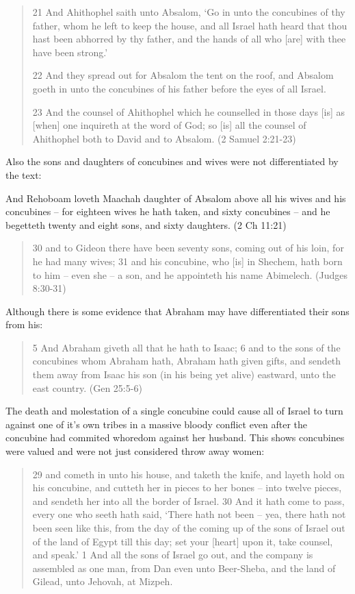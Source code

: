\documentclass[11pt]{article}
\begin{document}
{\begin{quote}
21 And Ahithophel saith unto Absalom, `Go in unto the concubines of thy father, whom he left to keep the house, and all Israel hath heard that thou hast been abhorred by thy father, and the hands of all who [are] with thee have been strong.'

22 And they spread out for Absalom the tent on the roof, and Absalom goeth in unto the concubines of his father before the eyes of all Israel.

23 And the counsel of Ahithophel which he counselled in those days [is] as [when] one inquireth at the word of God; so [is] all the counsel of Ahithophel both to David and to Absalom.
(2 Samuel 2:21-23)
\end{quote}

Also the sons and daughters of concubines and wives were not differentiated by the text:

And Rehoboam loveth Maachah daughter of Absalom above all his wives and his concubines -- for eighteen wives he hath taken, and sixty concubines -- and he begetteth twenty and eight sons, and sixty daughters. (2 Ch 11:21)
\begin{quote}
30 and to Gideon there have been seventy sons, coming out of his loin, for he had many wives;
31 and his concubine, who [is] in Shechem, hath born to him -- even she -- a son, and he appointeth his name Abimelech. (Judges 8:30-31)
\end{quote}

Although there is some evidence that Abraham may have differentiated their sons from his:
\begin{quote}
5 And Abraham giveth all that he hath to Isaac;
6 and to the sons of the concubines whom Abraham hath, Abraham hath given gifts, and sendeth them away from Isaac his son (in his being yet alive) eastward, unto the east country. (Gen 25:5-6)
\end{quote}

The death and molestation of a single concubine could cause all of Israel to turn against one of it's own tribes in a massive bloody conflict even after the concubine had commited whoredom against her husband. This shows concubines were valued and were not just considered throw away women:

\begin{quote}
29 and cometh in unto his house, and taketh the knife, and layeth hold on his concubine, and cutteth her in pieces to her bones -- into twelve pieces, and sendeth her into all the border of Israel.
30 And it hath come to pass, every one who seeth hath said, `There hath not been -- yea, there hath not been seen like this, from the day of the coming up of the sons of Israel out of the land of Egypt till this day; set your [heart] upon it, take counsel, and speak.'
1 And all the sons of Israel go out, and the company is assembled as one man, from Dan even unto Beer-Sheba, and the land of Gilead, unto Jehovah, at Mizpeh.


\end{quote}}
\end{document}
